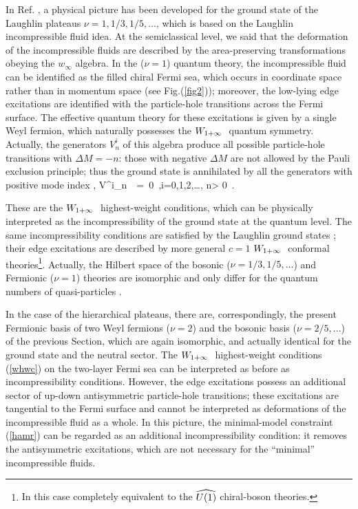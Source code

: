 In Ref. \cite{ctz1}, a physical picture has been developed for the
ground state of the Laughlin plateaus $\nu=1,1/3,1/5,\dots$, 
which is based on the Laughlin incompressible fluid idea.
At the semiclassical level, we said that the deformation
of the incompressible fluids are described by the area-preserving 
transformations obeying the $w_{\infty}$ algebra. 
In the ($\nu=1$) quantum theory, the incompressible fluid can 
be identified as the filled chiral Fermi sea, which occurs in coordinate
space rather than in momentum space (see Fig.(\ref{fig2})); moreover,
the low-lying edge excitations  
are identified with the particle-hole transitions across the Fermi surface. 
The effective quantum theory
for these excitations is given by a single Weyl fermion, which
naturally possesses the $W_{1+\infty}\ $ quantum symmetry. Actually, the
generators $V^i_n$ of this algebra produce all possible particle-hole 
transitions with $\Delta M=-n$: those with negative $\Delta M$
are not allowed by the Pauli exclusion principle;
thus the ground state is annihilated by all the generators
with positive mode index \cite{ctz1},
\beq
V^i_n\ \vert \Omega \rangle\ =\ 0\ ,\qquad i=0,1,2,\dots, \qquad
n> 0\ .
\label{whwc}
\eeq

These are the $W_{1+\infty}\ $ highest-weight conditions, which
can be physically interpreted as the incompressibility of the
ground state at the quantum level.
The same incompressibility conditions are 
satisfied by the Laughlin ground states \cite{ctz1}\cite{sakita};
their edge excitations are described by more general 
$c=1$ $W_{1+\infty}\ $ conformal theories\footnote{
In this case completely equivalent to the $\u1$ chiral-boson theories.}.
Actually, the Hilbert space of the bosonic
($\nu=1/3,1/5,\dots$) and Fermionic ($\nu=1$) theories are
isomorphic and only differ for the quantum numbers of quasi-particles 
\cite{wen}. 

In the case of the hierarchical plateaus, there are, correspondingly,
the present Fermionic basis of two Weyl fermions ($\nu=2$) and
the bosonic basis ($\nu=2/5,\dots$) of the previous Section,
which are again isomorphic, and actually identical for the 
ground state and the neutral sector. 
The $W_{1+\infty}\ $ highest-weight conditions (\ref{whwc}) on the two-layer Fermi sea 
can be interpreted as before as incompressibility conditions. 
However, the edge excitations possess an additional sector of
up-down antisymmetric particle-hole transitions; these excitations 
are tangential to the 
Fermi surface and cannot be interpreted as deformations of the
incompressible fluid as a whole. In this picture, the
minimal-model constraint (\ref{hamr}) 
can be regarded as an additional incompressibility
condition: it removes the antisymmetric excitations,
which are not necessary for the ``minimal'' incompressible fluids.


